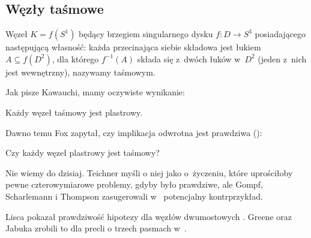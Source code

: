 \subsection{Węzły taśmowe}
\begin{definition}
    Węzeł $K = f(S^1)$ będący brzegiem singularnego dysku $f \colon D \to S^3$ posiadającego następującą własność: każda przecinająca siebie składowa jest łukiem $A \subseteq f(D^2)$, dla którego $f^{-1}(A)$ składa się z~dwóch łuków w~$D^2$ (jeden z~nich jest wewnętrzny), nazywamy taśmowym.
\end{definition}

Jak pisze Kawauchi, mamy oczywiste wynikanie:

\begin{proposition}
%
    Każdy węzeł taśmowy jest plastrowy.
\end{proposition}

Dawno temu Fox zapytał, czy implikacja odwrotna jest prawdziwa (\cite[problem 1.33]{kirby78}):

\begin{conjecture}
    Czy każdy węzeł plastrowy jest taśmowy?
\end{conjecture}

Nie wiemy do dzisiaj.
Teichner myśli o niej jako o~życzeniu, które uprościłoby pewne czterowymiarowe problemy, gdyby było prawdziwe, ale Gompf, Scharlemann i Thompson zasugerowali w~\cite{gompf10} potencjalny kontrprzykład.

Lisca pokazał prawdziwość hipotezy dla węzłów dwumostowych \cite{lisca07}.
%
Greene oraz Jabuka zrobili to dla precli o trzech pasmach w~\cite{greene11}.
%


